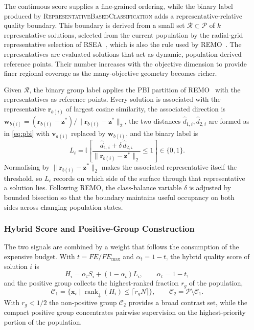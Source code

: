 \documentclass[final,5p,times,twocolumn]{elsarticle}
\newcommand{\vx}{\mathbf{x}}
\newcommand{\vv}{\mathbf{v}}
\newcommand{\vw}{\mathbf{w}}
\newcommand{\vr}{\mathbf{r}}
\newcommand{\vz}{\mathbf{z}}
\begin{document}
The continuous score supplies a fine-grained ordering, while the binary label
produced by \textsc{RepresentativeBasedClassification} adds a
representative-relative quality boundary. This boundary is derived from a small set
$\mathcal{R}\subset\mathcal{P}$ of $k$ representative solutions, selected from
the current population by the radial-grid representative selection of
RSEA~\cite{ref:rsea}, which is also the rule used by REMO~\cite{ref:remo}. The
representatives are evaluated solutions that act as dynamic, population-derived
reference points. Their number increases with the objective dimension to provide
finer regional coverage as the many-objective geometry becomes richer.

Given $\mathcal{R}$, the binary group label applies the PBI partition of
REMO~\cite{ref:remo} with the representatives as reference points. Every
solution is associated with the representative $\vr_{b(i)}$ of largest cosine
similarity, the associated direction is
$\vw_{b(i)}=(\vr_{b(i)}-\vz^{*})/\|\vr_{b(i)}-\vz^{*}\|_2$, the two distances
$\hat d_{1,i},\hat d_{2,i}$ are formed as in \eqref{eq:pbi} with
$\vv_{a(i)}$ replaced by $\vw_{b(i)}$, and the binary label is
\begin{equation}
L_i=\mathbb{I}\!\left[
\frac{\hat d_{1,i}+\delta\,\hat d_{2,i}}
     {\|\vr_{b(i)}-\vz^{*}\|_2}\leq1\right]\in\{0,1\}.
\label{eq:label-bin}
\end{equation}
Normalising by $\|\vr_{b(i)}-\vz^{*}\|_2$ makes the associated representative
itself the threshold, so $L_i$ records on which side of the surface through that
representative a solution lies. Following REMO, the class-balance variable
$\delta$ is adjusted by bounded bisection so that the boundary maintains useful
occupancy on both sides across changing population states.

\subsubsection{Hybrid Score and Positive-Group Construction}
\label{sec:method:paqc:hybrid}

The two signals are combined by a weight that follows the consumption of the
expensive budget. With $t=FE/FE_{\max}$ and $\alpha_t=1-t$, the hybrid quality
score of solution $i$ is
\begin{equation}
H_i=\alpha_t S_i+(1-\alpha_t)L_i ,
\qquad
\alpha_t=1-t ,
\label{eq:fuse}
\end{equation}
and the positive group collects the highest-ranked fraction $r_g$ of the
population,
\begin{equation}
\mathcal{C}_1=\bigl\{\vx_i\;\big|\;
\operatorname{rank}_{\downarrow}(H_i)\leq\lceil r_gN\rceil\bigr\},
\qquad
\mathcal{C}_2=\mathcal{P}\setminus\mathcal{C}_1 .
\label{eq:group}
\end{equation}
With $r_g<1/2$ the non-positive group $\mathcal{C}_2$ provides a broad contrast
set, while the compact positive group concentrates pairwise supervision on the
highest-priority portion of the population.
\end{document}
